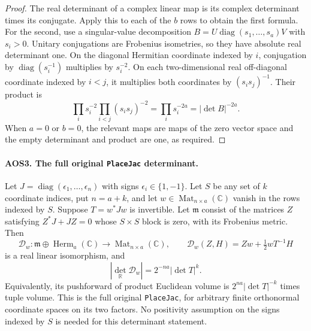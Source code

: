 \documentclass[11pt,a4paper]{article}
\numberwithin{equation}{section}
\theoremstyle{remark}\newtheorem{remark}[theorem]{Remark}
\begin{document}
\begin{proof}
The real determinant of a complex linear map is its complex
determinant times its conjugate.  Apply this to each of the $b$ rows
to obtain the first formula.  For the second, use a singular-value
decomposition $B=U\operatorname{diag}(s_1,\ldots,s_a)V$ with $s_i>0$.
Unitary conjugations are Frobenius isometries, so they have absolute
real determinant one.  On the diagonal Hermitian coordinate indexed
by $i$, conjugation by $\operatorname{diag}(s_i^{-1})$ multiplies by
$s_i^{-2}$.  On each two-dimensional real off-diagonal coordinate
indexed by $i<j$, it multiplies both coordinates by $(s_is_j)^{-1}$.
Their product is
\[
       \prod_i s_i^{-2}\prod_{i<j}(s_is_j)^{-2}
          =\prod_i s_i^{-2a}=|\det B|^{-2a}.
 \tag{AOS.8}
\]
When $a=0$ or $b=0$, the relevant maps are maps of the zero vector
space and the empty determinant and product are one, as required.
\end{proof}

\paragraph{AOS3. The full original \texttt{Place\allowbreak Jac} determinant.}
\label{claim:AOS3}
Let $J=\operatorname{diag}(\epsilon_1,\ldots,\epsilon_n)$ with signs
$\epsilon_i\in\{1,-1\}$.  Let $S$ be any set of $k$ coordinate
indices, put $n=a+k$, and let $w\in\operatorname{Mat}_{n\times a}
(\mathbb C)$ vanish in the rows indexed by $S$.  Suppose
$T=w^*Jw$ is invertible.  Let $\mathfrak m$ consist of the matrices
$Z$ satisfying $Z^*J+JZ=0$ whose $S\times S$ block is zero, with its
Frobenius metric.  Then
\[
 \mathcal D_w:\mathfrak m\oplus\operatorname{Herm}_a(\mathbb C)
       \longrightarrow\operatorname{Mat}_{n\times a}(\mathbb C),
 \qquad
 \mathcal D_w(Z,H)=Zw+\tfrac12wT^{-1}H
 \tag{AOS.9}
\]
is a real linear isomorphism, and
\[
        |\det_{\mathbb R}\mathcal D_w|
                =2^{-na}|\det T|^k.
 \tag{AOS.10}
\]
Equivalently, its pushforward of product Euclidean volume is
$2^{na}|\det T|^{-k}$ times tuple volume.  This is the full original
\texttt{Place\allowbreak Jac}, for arbitrary finite orthonormal coordinate
spaces on its two factors.  No positivity assumption on the signs
indexed by $S$ is needed for this determinant statement.
\end{document}
